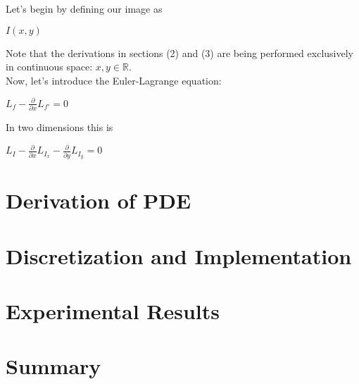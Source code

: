 \documentclass{article}
\begin{document}
  \noindent
  Let's begin by defining our image as
    \begin{center}
      $I(x,y)$
    \end{center}
  Note that the derivations in sections (2) and (3) are being performed
  exclusively in continuous space: $x,y \in \mathbb{R}$.
  \\
  
  \newpage
  \noindent
  Now, let's introduce the Euler-Lagrange equation:
    \begin{center}
      $L_{f} - \frac{\partial}{\partial x}L_{f'} = 0$
    \end{center}
  In two dimensions this is
    \begin{center}
      $L_{I} - \frac{\partial}{\partial x}L_{I_{x}} - \frac{\partial}{\partial y}L_{I_{y}} = 0$
    \end{center}






  \newpage
  \section{Derivation of PDE}

  \section{Discretization and Implementation}


  \section{Experimental Results}


  \section{Summary}
\end{document}
